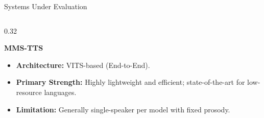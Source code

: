 \documentclass{beamer}
\begin{document}
\begin{frame}{Systems Under Evaluation}
    \vspace{0.3cm}
    
    \begin{columns}[t]
        
        \begin{column}{0.32\textwidth}
            \begin{block}{\small \centering \textbf{MMS-TTS}}
                \begin{itemize}\footnotesize
                    \setlength\itemsep{0.5em}
                    \item \textbf{Architecture:} VITS-based (End-to-End).
                    \item \textbf{Primary Strength:} Highly lightweight and efficient; state-of-the-art for low-resource languages.
                    \item \textbf{Limitation:} Generally single-speaker per model with fixed prosody.
                \end{itemize}
                \vspace{0.2cm}
            \end{block}
        \end{column}


\end{columns}
\end{frame}
\end{document}

